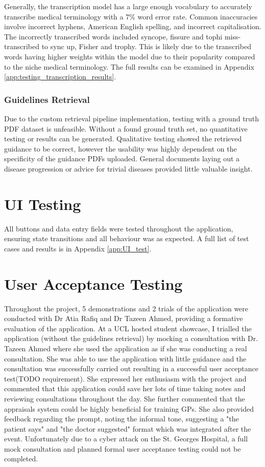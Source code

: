 Generally, the transcription model has a large enough vocabulary to accurately transcribe medical terminology with a 7\% word error rate. Common inaccuracies involve incorrect hyphens, American English spelling, and incorrect capitalisation. The incorrectly transcribed words included syncope, fissure and tophi miss-transcribed to sync up, Fisher and trophy. This is likely due to the transcribed words having higher weights within the model due to their popularity compared to the niche medical terminology. The full results can be examined in Appendix \ref{app:testing_transcription_results}.


\subsubsection{Guidelines Retrieval}
Due to the custom retrieval pipeline implementation, testing with a ground truth PDF dataset is unfeasible. Without a found ground truth set, no quantitative testing or results can be generated. Qualitative testing showed the retrieved guidance to be correct, however the usability was highly dependent on the specificity of the guidance PDFs uploaded. General documents laying out a disease progression or advice for trivial diseases provided little valuable insight. 

\section{UI Testing}
All buttons and data entry fields were tested throughout the application, ensuring state transitions and all behaviour was as expected. A full list of test cases and results is in Appendix \ref{app:UI_test}.

\section{User Acceptance Testing}
Throughout the project, 5 demonstrations and 2 trials of the application were conducted with Dr Atia Rafiq and Dr Tazeen Ahmed, providing a formative evaluation of the application. At a UCL hosted student showcase, I trialled the application (without the guidelines retrieval) by mocking a consultation with Dr. Tazeen Ahmed where she used the application as if she was conducting a real consultation. She was able to use the application with little guidance and the consultation was successfully carried out resulting in a successful user acceptance test(TODO requirement). She expressed her enthusiasm with the project and commented that this application could save her lots of time taking notes and reviewing consultations throughout the day. She further commented that the appraisals system could be highly beneficial for training GPs. She also provided feedback regarding the prompt, noting the informal tone, suggesting a "the patient says" and "the doctor suggested" format which was integrated after the event. Unfortunately due to a cyber attack on the St. Georges Hospital, a full mock consultation and planned formal user acceptance testing could not be completed.

